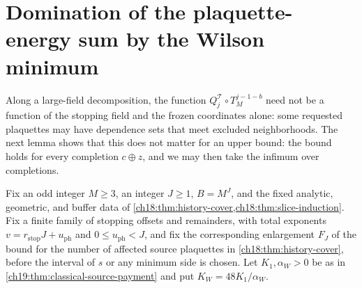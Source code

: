 \section{Domination of the plaquette-energy sum by the Wilson minimum}\label{ch19:sec:source}

Along a large-field decomposition, the function $Q_j^{\mathcal T}\circ T_M^{j-1-b}$ need not be a function of the stopping field and the frozen coordinates alone: some requested plaquettes may have dependence sets that meet excluded neighborhoods. The next lemma shows that this does not matter for an upper bound: the bound holds for every completion $c\oplus z$, and we may then take the infimum over completions.

\begin{lemma}\label{ch19:lem:compact-wilson-source-cap}
Fix an odd integer $M\ge3$, an integer $J\ge1$, $B=M^J$, and the fixed analytic, geometric, and buffer data of \cref{ch18:thm:history-cover,ch18:thm:slice-induction}. Fix a finite family of stopping offsets and remainders, with total exponents $v=r_{\mathrm{stop}}J+u_{\mathrm{ph}}$ and $0\le u_{\mathrm{ph}}<J$, and fix the corresponding enlargement $F_J$ of the bound for the number of affected source plaquettes in \cref{ch18:thm:history-cover}, before the interval of $s$ or any minimum side is chosen. Let $K_1,\alpha_W>0$ be as in \cref{ch19:thm:classical-source-payment} and put $K_W=48K_1/\alpha_W$.


\end{lemma}
